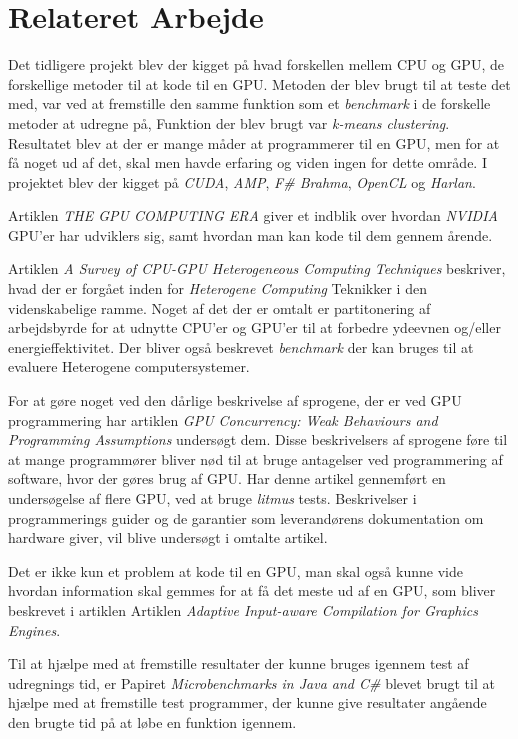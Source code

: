 \section{Relateret Arbejde}
\label{relateret_arbejde}
Det tidligere projekt \cite{P9} blev der kigget på hvad forskellen mellem CPU og GPU, de forskellige metoder til at kode til en GPU. Metoden der blev brugt til at teste det med, var ved at fremstille den samme funktion som et \textit{benchmark} i de forskelle metoder at udregne på, Funktion der blev brugt var \textit{k-means clustering}. Resultatet blev at der er mange måder at programmerer til en GPU, men for at få noget ud af det, skal men havde erfaring og viden ingen for dette område. I projektet blev der kigget på \textit{CUDA}, \textit{AMP}, \textit{F\# Brahma}, \textit{OpenCL} og \textit{Harlan}. 

Artiklen \textit{THE GPU COMPUTING ERA}\cite{nickolls2010gpu} giver et indblik over hvordan \textit{NVIDIA} GPU'er har udviklers sig, samt hvordan man kan kode til dem gennem årende.

Artiklen \textit{A Survey of CPU-GPU Heterogeneous Computing Techniques}\cite{mittalsurvey} beskriver, hvad der er forgået inden for \textit{Heterogene Computing} Teknikker i den videnskabelige ramme. Noget af det der er omtalt er partitonering af arbejdsbyrde for at udnytte CPU'er og GPU'er til at forbedre ydeevnen og/eller energieffektivitet. Der bliver også beskrevet \textit{benchmark} der kan bruges til at evaluere Heterogene computersystemer.

For at gøre noget ved den dårlige beskrivelse af sprogene, der er ved GPU programmering har artiklen \textit{GPU Concurrency: Weak Behaviours and Programming Assumptions}\cite{alglave2015gpu} undersøgt dem. Disse beskrivelsers af sprogene føre til at mange programmører bliver nød til at bruge antagelser ved programmering af software, hvor der gøres brug af GPU. Har denne artikel gennemført en undersøgelse af flere GPU, ved at bruge \textit{litmus} tests. Beskrivelser i programmerings guider og de garantier som leverandørens dokumentation om hardware giver, vil blive undersøgt i omtalte artikel.

Det er ikke kun et problem at kode til en GPU, man skal også kunne vide hvordan information skal gemmes for at få det meste ud af en GPU, som bliver beskrevet i artiklen Artiklen \textit{Adaptive Input-aware Compilation for Graphics Engines}\cite{samadi2012adaptive}.

Til at hjælpe med at fremstille resultater der kunne bruges igennem test af udregnings tid, er Papiret \textit{Microbenchmarks in Java and C\#}\cite{Microbenchmarks} blevet brugt til at hjælpe med at fremstille test programmer, der kunne give resultater angående den brugte tid på at løbe en funktion igennem.

